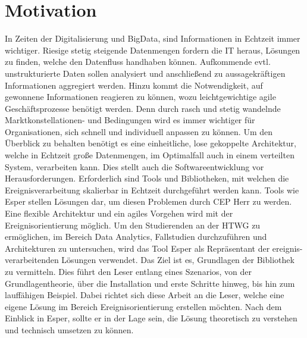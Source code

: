 \chapter{Motivation}
In Zeiten der Digitalisierung und BigData, sind Informationen in Echtzeit immer wichtiger. Riesige stetig steigende Datenmengen fordern die IT heraus, Lösungen zu finden, welche den Datenfluss handhaben können. Aufkommende evtl. unstrukturierte Daten sollen analysiert und anschließend zu aussagekräftigen Informationen aggregiert werden.
Hinzu kommt die Notwendigkeit, auf gewonnene Informationen reagieren zu können, wozu leichtgewichtige agile Geschäftsprozesse benötigt werden.
Denn durch rasch und stetig wandelnde Marktkonstellationen- und Bedingungen wird es immer wichtiger für Organisationen, sich schnell und individuell anpassen zu können. 
\absatz
Um den Überblick zu behalten benötigt es eine einheitliche, lose gekoppelte Architektur, welche in Echtzeit große Datenmengen, im Optimalfall auch in einem verteilten System, verarbeiten kann. Dies stellt auch die Softwareentwicklung vor Herausforderungen.
Erforderlich sind Tools und Bibliotheken, mit welchen die Ereignisverarbeitung skalierbar in Echtzeit durchgeführt werden kann. Tools wie Esper stellen Lösungen dar, um diesen Problemen durch \ac{CEP} Herr zu werden. Eine flexible Architektur und ein agiles Vorgehen wird mit der Ereignisorientierung möglich.
\absatz
Um den Studierenden an der HTWG zu ermöglichen, im Bereich Data Analytics, Fallstudien durchzuführen und Architekturen zu untersuchen, wird das Tool Esper als Repräsentant der ereignis-verarbeitenden Lösungen verwendet.
Das Ziel ist es, Grundlagen der Bibliothek zu vermitteln. Dies führt den Leser entlang eines Szenarios, von der Grundlagentheorie, über die Installation und erste Schritte hinweg, bis hin zum lauffähigen Beispiel.
Dabei richtet sich diese Arbeit an die Leser, welche eine eigene Lösung im Bereich Ereignisorientierung erstellen möchten.
Nach dem Einblick in Esper, sollte er in der Lage sein, die Lösung theoretisch zu verstehen und technisch umsetzen zu können.